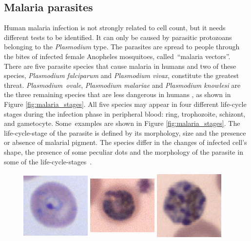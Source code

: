 \documentclass[final,a4paper,12pt,english]{UnicaPhdThesis3}
\begin{document}
{\subsection{Malaria parasites}
Human malaria infection is not strongly related to cell count, but it needs different tests to be identified. It can only be caused by parasitic protozoans belonging to the \emph{Plasmodium} type. The parasites are spread to people through the bites of infected female Anopheles mosquitoes, called~``malaria vectors''.
There are five parasite species that cause malaria in humans and two of these species, \emph{Plasmodium falciparum} and \emph{Plasmodium vivax}, constitute the greatest threat. \emph{Plasmodium~ovale}, \emph{Plasmodium malariae} and \emph{Plasmodium knowlesi} are the three remaining species that are less dangerous in humans \cite{WHO_dec_2016}, as shown in Figure \ref{fig:malaria_stages}.
All five species may appear in four different life-cycle stages during the infection phase in peripheral blood: ring, trophozoite, schizont, and gametocyte. Some~examples are shown in Figure \ref{fig:malaria_stages}.
The life-cycle-stage of the parasite is defined by its morphology, size and the presence or absence of malarial pigment.
The species differ in the changes of infected cell's shape, the presence of some peculiar dots and the morphology of the parasite in some of the life-cycle-stages~\cite{Somasekar2011}.
\begin{figure}[H]
	\centering
	\includegraphics[width=3.5cm, height=3.5cm]{images/malaria/falciparum_1_ring}
	\includegraphics[width=3.5cm, height=3.5cm]{images/malaria/falciparum_2_trophozoiteAge}
	\includegraphics[width=3.5cm, height=3.5cm]{images/malaria/falciparum_3_schizont}

\end{figure}}
\end{document}
